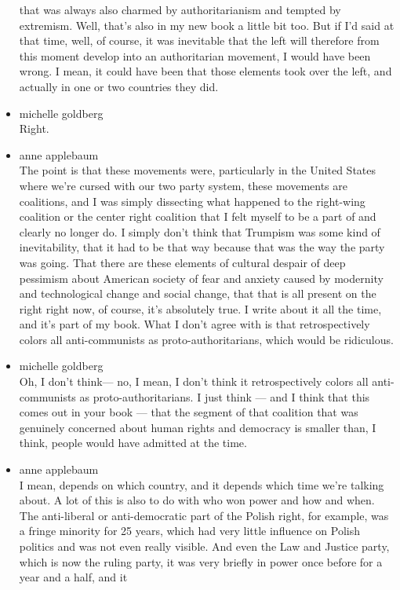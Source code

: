\begin{itemize}
  that was always also charmed by authoritarianism and tempted by
  extremism. Well, that's also in my new book a little bit too. But if
  I'd said at that time, well, of course, it was inevitable that the
  left will therefore from this moment develop into an authoritarian
  movement, I would have been wrong. I mean, it could have been that
  those elements took over the left, and actually in one or two
  countries they did.
\item
  michelle goldberg\\
  Right.
\item
  anne applebaum\\
  The point is that these movements were, particularly in the United
  States where we're cursed with our two party system, these movements
  are coalitions, and I was simply dissecting what happened to the
  right-wing coalition or the center right coalition that I felt myself
  to be a part of and clearly no longer do. I simply don't think that
  Trumpism was some kind of inevitability, that it had to be that way
  because that was the way the party was going. That there are these
  elements of cultural despair of deep pessimism about American society
  of fear and anxiety caused by modernity and technological change and
  social change, that that is all present on the right right now, of
  course, it's absolutely true. I write about it all the time, and it's
  part of my book. What I don't agree with is that retrospectively
  colors all anti-communists as proto-authoritarians, which would be
  ridiculous.
\item
  michelle goldberg\\
  Oh, I don't think--- no, I mean, I don't think it retrospectively
  colors all anti-communists as proto-authoritarians. I just think ---
  and I think that this comes out in your book --- that the segment of
  that coalition that was genuinely concerned about human rights and
  democracy is smaller than, I think, people would have admitted at the
  time.
\item
  anne applebaum\\
  I mean, depends on which country, and it depends which time we're
  talking about. A lot of this is also to do with who won power and how
  and when. The anti-liberal or anti-democratic part of the Polish
  right, for example, was a fringe minority for 25 years, which had very
  little influence on Polish politics and was not even really visible.
  And even the Law and Justice party, which is now the ruling party, it
  was very briefly in power once before for a year and a half, and it

\end{itemize}
